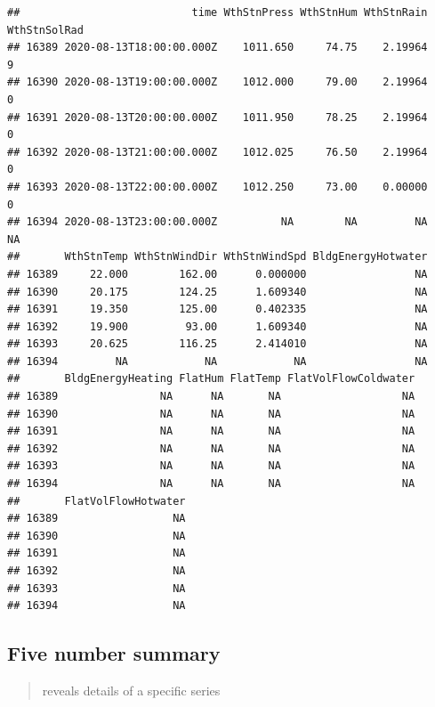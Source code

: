 \documentclass[
]{book}
\newenvironment{Shaded}{\begin{snugshade}}{\end{snugshade}}
\newcommand{\KeywordTok}[1]{\textcolor[rgb]{0.13,0.29,0.53}{\textbf{#1}}}
\newcommand{\NormalTok}[1]{#1}
\newcommand{\OperatorTok}[1]{\textcolor[rgb]{0.81,0.36,0.00}{\textbf{#1}}}
\begin{document}
\begin{verbatim}
##                           time WthStnPress WthStnHum WthStnRain WthStnSolRad
## 16389 2020-08-13T18:00:00.000Z    1011.650     74.75    2.19964            9
## 16390 2020-08-13T19:00:00.000Z    1012.000     79.00    2.19964            0
## 16391 2020-08-13T20:00:00.000Z    1011.950     78.25    2.19964            0
## 16392 2020-08-13T21:00:00.000Z    1012.025     76.50    2.19964            0
## 16393 2020-08-13T22:00:00.000Z    1012.250     73.00    0.00000            0
## 16394 2020-08-13T23:00:00.000Z          NA        NA         NA           NA
##       WthStnTemp WthStnWindDir WthStnWindSpd BldgEnergyHotwater
## 16389     22.000        162.00      0.000000                 NA
## 16390     20.175        124.25      1.609340                 NA
## 16391     19.350        125.00      0.402335                 NA
## 16392     19.900         93.00      1.609340                 NA
## 16393     20.625        116.25      2.414010                 NA
## 16394         NA            NA            NA                 NA
##       BldgEnergyHeating FlatHum FlatTemp FlatVolFlowColdwater
## 16389                NA      NA       NA                   NA
## 16390                NA      NA       NA                   NA
## 16391                NA      NA       NA                   NA
## 16392                NA      NA       NA                   NA
## 16393                NA      NA       NA                   NA
## 16394                NA      NA       NA                   NA
##       FlatVolFlowHotwater
## 16389                  NA
## 16390                  NA
## 16391                  NA
## 16392                  NA
## 16393                  NA
## 16394                  NA
\end{verbatim}

\hypertarget{five-number-summary}{%
\subsection{Five number summary}\label{five-number-summary}}

\begin{quote}
reveals details of a specific series
\end{quote}

\begin{Shaded}
\end{Shaded}
\end{document}
